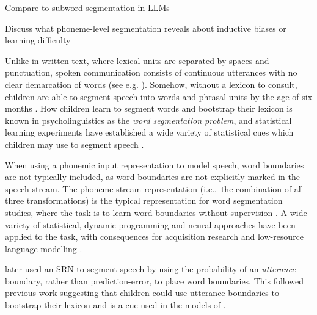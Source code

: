Compare to subword segmentation in LLMs

Discuss what phoneme-level segmentation reveals about inductive biases or learning difficulty

Unlike in written text, where lexical units are separated by spaces and punctuation, spoken communication consists of continuous utterances with no clear demarcation of words (see e.g. \citet{cole1980model}). Somehow, without a lexicon to consult, children are able to segment speech into words and phrasal units by the age of six months \citep{Jusczyk1999infants}. How children learn to segment words and bootstrap their lexicon is known in psycholinguistics as the \emph{word segmentation problem}, and statistical learning experiments have established a wide variety of statistical cues which children may use to segment speech \citep{Cutler1987, gleitman1988learning, Jusczyk1993stress, Saffran1996distributional, Jusczyk1999allophonic, Suomi1997}.


When using a phonemic input representation to model speech, word boundaries are not typically included, as word boundaries are not explicitly marked in the speech stream. The phoneme stream representation (i.e.,\ the combination of all three transformations) is the typical representation for word segmentation studies, where the task is to learn word boundaries without supervision \citep{Brent1999}. A wide variety of statistical, dynamic programming and neural approaches have been applied to the task, with consequences for acquisition research and low-resource language modelling \citep{Blanchard2010, Coltekin2017, algayres_dp-parse_2022, goriely2023word}.


\citet{christiansen1998learning} later used an SRN to segment speech by using the probability of an \emph{utterance} boundary, rather than prediction-error, to place word boundaries. This followed previous work suggesting that children could use utterance boundaries to bootstrap their lexicon \citep{aslin1996models} and is a cue used in the models of \citet{ccoltekin2014explicit, goriely2023word}.


